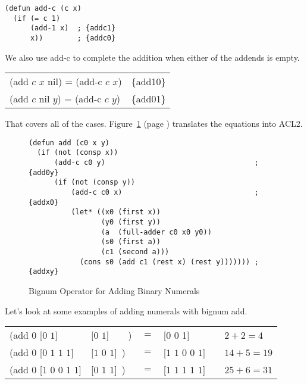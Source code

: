 \label{add-c-defun} 
\begin{Verbatim}
(defun add-c (c x)
  (if (= c 1)
      (add-1 x)  ; {addc1}
      x))        ; {addc0}
\end{Verbatim}

We also use add-c to complete the addition when either of the addends is empty.
\begin{center}
\begin{tabular}{ll}
(add $c$ $x$ nil) = (add-c $c$ $x$)   & \{add10\} \\
(add $c$ nil $y$) = (add-c $c$ $y$)   & \{add01\} \\
\end{tabular}
\end{center}

That covers all of the cases.
Figure~\ref{fig:bignum-add-defun} (page \pageref{fig:bignum-add-defun})
translates the equations into ACL2.

\begin{figure}
\begin{Verbatim}
(defun add (c0 x y)
  (if (not (consp x))
      (add-c c0 y)                                   ; {add0y}
      (if (not (consp y))
          (add-c c0 x)                               ; {addx0}
          (let* ((x0 (first x))
                 (y0 (first y))
                 (a  (full-adder c0 x0 y0))
                 (s0 (first a))
                 (c1 (second a)))
            (cons s0 (add c1 (rest x) (rest y))))))) ; {addxy}
\end{Verbatim}
\caption{Bignum Operator for Adding Binary Numerals}
\label{fig:bignum-add-defun}
\end{figure}

Let's look at some examples of adding numerals with bignum add.
\begin{center}
\begin{tabular}{lllll}
(add $0$ [$0$ $1$]             &[$0$ $1$]~~~~)  &$=$ &[$0$ $0$ 1]           & ~~$2 + 2 = 4$   \\
(add $0$ [$0$ $1$ $1$ $1$]     &[$1$ $0$ $1$]~) &$=$ &[$1$ $1$ $0$ $0$ $1$] & ~~$14 + 5 = 19$ \\
(add $0$ [$1$ $0$ $0$ $1$ $1$] &[$0$ $1$ $1$]~) &$=$ &[$1$ $1$ $1$ $1$ $1$] & ~~$25 + 6 = 31$ \\
\end{tabular}
\end{center}

